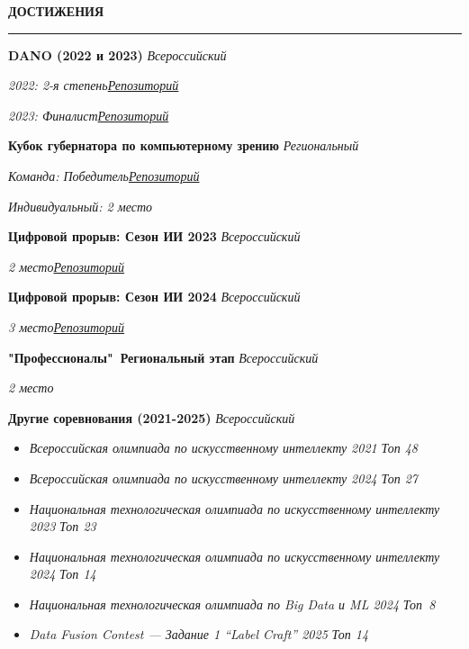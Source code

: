\documentclass[10pt,a4paper]{article}
\newcommand{\sechead}[1]{%
  \noindent\textbf{#1}\par
  \vspace{-8pt}
  \noindent\rule{\linewidth}{0.4pt}\par\vspace{0.1cm}
}
\begin{document}
\sechead{ДОСТИЖЕНИЯ}

\textbf{DANO (2022 и 2023)} \hfill \emph{Всероссийский}

\textit{2022: 2-я степень}\hfill \emph{\href{https://github.com/D1ffic00lt/dano-olympiad-final-stage}{Репозиторий}}\vspace{0cm}

\textit{2023: Финалист}\hfill \emph{\href{https://github.com/D1ffic00lt/dano-2023}{Репозиторий}}\vspace{0.1cm}

\textbf{Кубок губернатора по компьютерному зрению} \hfill \emph{Региональный}

\textit{Команда: Победитель}\hfill \emph{\href{https://github.com/D1ffic00lt/computer-vision-cup}{Репозиторий}}\vspace{0cm}

\textit{Индивидуальный: 2 место}\vspace{0.1cm}


\textbf{Цифровой прорыв: Сезон ИИ 2023} \hfill \emph{Всероссийский}

\textit{2 место}\hfill \emph{\href{https://github.com/llitone/rutube-video-captioning}{Репозиторий}}\vspace{0.1cm}


\textbf{Цифровой прорыв: Сезон ИИ 2024} \hfill \emph{Всероссийский}

\textit{3 место}\hfill \emph{\href{https://github.com/D1ffic00lt/Sky-Eye}{Репозиторий}}\vspace{0.1cm}

\textbf{"Профессионалы"\ Региональный этап} \hfill \emph{Всероссийский}

\textit{2 место}\vspace{0.1cm}

\textbf{Другие соревнования (2021-2025)} \hfill \emph{Всероссийский}

\begin{itemize}[
    label=$\cdot$, 
    itemsep=0.1em,
    topsep=0pt,
    parsep=0pt
]
    \item \textit{Всероссийская олимпиада по искусственному интеллекту 2021} \hfill \emph{Топ 48}
    \item \textit{Всероссийская олимпиада по искусственному интеллекту 2024} \hfill \emph{Топ 27}
    \item \textit{Национальная технологическая олимпиада по искусственному интеллекту 2023} \hfill \emph{Топ 23}
    \item \textit{Национальная технологическая олимпиада по искусственному интеллекту 2024} \hfill \emph{Топ 14}
    \item \textit{Национальная технологическая олимпиада по Big Data и ML 2024} \hfill \mbox{\emph{Топ 8}\hspace{1ex}} 
    \item \textit{Data Fusion Contest — Задание 1 “Label Craft” 2025} \hfill \emph{Топ 14}
\end{itemize}\vspace{0.3cm}
\end{document}
